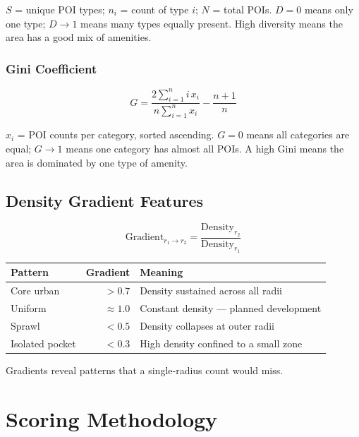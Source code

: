 \documentclass[11pt,a4paper]{article}
\begin{document}
$S$ = unique POI types; $n_i$ = count of type $i$; $N$ = total POIs. $D=0$ means only one type; $D\to 1$ means many types equally present. High diversity means the area has a good mix of amenities.

\subsubsection{Gini Coefficient}

\begin{equation}
G = \frac{2\displaystyle\sum_{i=1}^{n} i\,x_i}{n\displaystyle\sum_{i=1}^{n} x_i} - \frac{n+1}{n}
\end{equation}

$x_i$ = POI counts per category, sorted ascending. $G=0$ means all categories are equal; $G\to 1$ means one category has almost all POIs. A high Gini means the area is dominated by one type of amenity.

\subsection{Density Gradient Features}

\begin{equation}
\text{Gradient}_{r_1\to r_2} = \frac{\text{Density}_{r_2}}{\text{Density}_{r_1}}
\end{equation}

\begin{center}
\begin{tabular}{@{}lrl@{}}
\toprule
\textbf{Pattern} & \textbf{Gradient} & \textbf{Meaning} \\ \midrule
Core urban      & $>0.7$       & Density sustained across all radii \\
Uniform         & $\approx1.0$ & Constant density --- planned development \\
Sprawl          & $<0.5$       & Density collapses at outer radii \\
Isolated pocket & $<0.3$       & High density confined to a small zone \\ \bottomrule
\end{tabular}
\end{center}

Gradients reveal patterns that a single-radius count would miss.

\section{Scoring Methodology}
\end{document}
